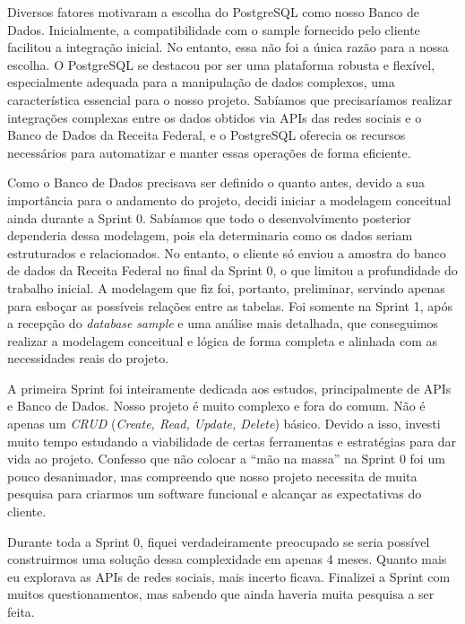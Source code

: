 \indent \originaltab{}Diversos fatores motivaram a escolha do PostgreSQL como nosso Banco de Dados. Inicialmente, a compatibilidade com o sample fornecido pelo cliente facilitou a integração inicial. No entanto, essa não foi a única razão para a nossa escolha. O PostgreSQL se destacou por ser uma plataforma robusta e flexível, especialmente adequada para a manipulação de dados complexos, uma característica essencial para o nosso projeto. Sabíamos que precisaríamos realizar integrações complexas entre os dados obtidos via APIs das redes sociais e o Banco de Dados da Receita Federal, e o PostgreSQL oferecia os recursos necessários para automatizar e manter essas operações de forma eficiente.\par

\indent \originaltab{}Como o Banco de Dados precisava ser definido o quanto antes, devido a sua importância para o andamento do projeto, decidi iniciar a modelagem conceitual ainda durante a Sprint 0. Sabíamos que todo o desenvolvimento posterior dependeria dessa modelagem, pois ela determinaria como os dados seriam estruturados e relacionados. No entanto, o cliente só enviou a amostra do banco de dados da Receita Federal no final da Sprint 0, o que limitou a profundidade do trabalho inicial. A modelagem que fiz foi, portanto, preliminar, servindo apenas para esboçar as possíveis relações entre as tabelas. Foi somente na Sprint 1, após a recepção do \textit{database} \textit{sample} e uma análise mais detalhada, que conseguimos realizar a modelagem conceitual e lógica de forma completa e alinhada com as necessidades reais do projeto.\par

\begin{reflection}
\indent \originaltab{}A primeira Sprint foi inteiramente dedicada aos estudos, principalmente de APIs e Banco de Dados. Nosso projeto é muito complexo e fora do comum. Não é apenas um \textit{CRUD} (\textit{Create, Read, Update, Delete}) básico. Devido a isso, investi muito tempo estudando a viabilidade de certas ferramentas e estratégias para dar vida ao projeto. Confesso que não colocar a “mão na massa” na Sprint 0 foi um pouco desanimador, mas compreendo que nosso projeto necessita de muita pesquisa para criarmos um software funcional e alcançar as expectativas do cliente.\originalspace{}\par

\indent \originaltab{}Durante toda a Sprint 0, fiquei verdadeiramente preocupado se seria possível construirmos uma solução dessa complexidade em apenas 4 meses. Quanto mais eu explorava as APIs de redes sociais, mais incerto ficava. Finalizei a Sprint com muitos questionamentos, mas sabendo que ainda haveria muita pesquisa a ser feita.\par

\end{reflection}
